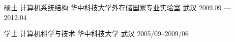 

\begin{cventries}

  \cventry
    {硕士   计算机系统结构} %
    {华中科技大学外存储国家专业实验室} %
    {武汉} %
    {2009.09 — 2012.04} %
    {
    }

  \cventry
    {学士   计算机科学与技术} %
    {华中科技大学} %
    {武汉} %
    {2005/09--2009/06} %
    {
    }

\end{cventries}
